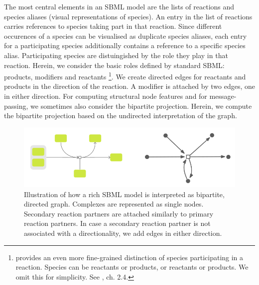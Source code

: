 \documentclass[
	fontsize=10pt, %
	twoside=false, %
	secnumdepth=1, %
  toc=indentunnumbered %
]{kaobook}
\begin{document}
The most central elements in an SBML model are the lists of reactions and
species aliases (visual representations of species). 
%
An entry in the list of reactions carries references to species taking part in
that reaction. Since different occurences of a species can be visualised as
duplicate species aliases, each entry for a participating species additionally
contains a reference to a specific species alias. Participating species are
distuingished by the role they play in that reaction. Herein, we consider the
basic roles defined by standard SBML: products, modifiers and reactants
\footnote{  provides an even more fine-grained
  distinction of species participating in a reaction. Species can be 
  reactants or products,  or  reactants or
  products. We omit this for simplicity. See
  \cite{_CellDesignerExtensionTag_2010}, ch. 2.4.
}.
We create directed edges for reactants and products in the
direction of the reaction. A modifier is attached by two edges, one in either
direction. For computing structural node features and for message-passing, we
sometimes also consider the
bipartite projection. Herein, we compute the bipartite projection based on the
undirected interpretation of the graph.

\begin{figure}[h]
  \centering
  \includegraphics[width=0.7\linewidth]{graph-interpretation.png}
  \caption[Illustration how a rich SBML model is interpreted as a
  graph.]{Illustration of how a rich SBML model is interpreted as bipartite,
    directed graph. Complexes are represented as single nodes. Secondary
    reaction partners are attached similarly to primary reaction partners. In
    case a secondary reaction partner is not associated with a directionality,
    we add edges in either direction.}
\end{figure}

\end{document}
